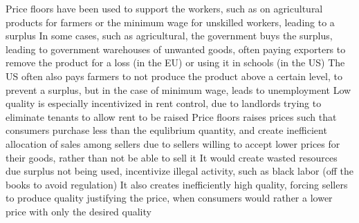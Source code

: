 \documentclass[11 pt, twoside]{article}
\newenvironment{outline*}
{
	\begin{outline}[enumerate]
	}
	{\end{outline}
}
\begin{document}
\begin{outline*}
\1 Price floors have been used to support the workers, such as on agricultural products for farmers or the minimum wage for unskilled workers, leading to a surplus
\2 In some cases, such as agricultural, the government buys the surplus, leading to government warehouses of unwanted goods, often paying exporters to remove the product for a loss (in the EU) or using it in schools (in the US)
\2 The US often also pays farmers to not produce the product above a certain level, to prevent a surplus, but in the case of minimum wage, leads to unemployment
\2 Low quality is especially incentivized in rent control, due to landlords trying to eliminate tenants to allow rent to be raised
\1 Price floors raises prices such that consumers purchase less than the equlibrium quantity, and create inefficient allocation of sales among sellers due to sellers willing to accept lower prices for their goods, rather than not be able to sell it
\2 It would create wasted resources due surplus not being used, incentivize illegal activity, such as black labor (off the books to avoid regulation)
\2 It also creates inefficiently high quality, forcing sellers to produce quality justifying the price, when consumers would rather a lower price with only the desired quality
\end{outline*}
\end{document}

